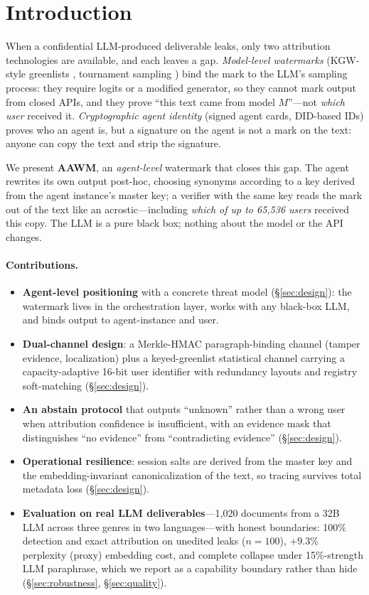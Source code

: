 \section{Introduction}
When a confidential LLM-produced deliverable leaks, only two
attribution technologies are available, and each leaves a gap. \emph{Model-level watermarks}
(KGW-style greenlists \cite{kgw}, tournament sampling \cite{synthid}) bind the mark to the LLM's
sampling process: they require logits or a modified generator, so they
cannot mark output from closed APIs, and they prove ``this text came from
model $M$''---not \emph{which user} received it. \emph{Cryptographic agent
identity} \cite{agentpin} (signed agent cards, DID-based IDs) proves who an agent is, but a
signature on the agent is not a mark on the text: anyone can copy the text
and strip the signature.

We present \textbf{AAWM}, an \emph{agent-level} watermark that closes this
gap. The agent rewrites its own output post-hoc, choosing synonyms according
to a key derived from the agent instance's master key; a verifier with the
same key reads the mark out of the text like an acrostic---including
\emph{which of up to 65,536 users} received this copy. The LLM is a pure
black box; nothing about the model or the API changes.

\paragraph{Contributions.}
\begin{itemize}
\item \textbf{Agent-level positioning} with a concrete threat model
(\S\ref{sec:design}): the watermark lives in the orchestration layer, works
with any black-box LLM, and binds output to agent-instance and user.
\item \textbf{Dual-channel design}: a Merkle-HMAC paragraph-binding channel
(tamper evidence, localization) plus a keyed-greenlist statistical channel
carrying a capacity-adaptive 16-bit user identifier with redundancy
layouts and registry soft-matching (\S\ref{sec:design}).
\item \textbf{An abstain protocol} that outputs ``unknown'' rather than a
wrong user when attribution confidence is insufficient, with an evidence
mask that distinguishes ``no evidence'' from ``contradicting evidence''
(\S\ref{sec:design}).
\item \textbf{Operational resilience}: session salts are derived from the
master key and the embedding-invariant canonicalization of the text, so
tracing survives total metadata loss (\S\ref{sec:design}).
\item \textbf{Evaluation on real LLM deliverables}---1,020 documents from a
32B LLM across three genres in two languages---with honest boundaries:
100\% detection and exact attribution on unedited leaks
($n{=}100$), $+9.3\%$ perplexity (proxy) embedding cost, and complete
collapse under 15\%-strength LLM paraphrase, which we report as a
capability boundary rather than hide (\S\ref{sec:robustness},
\S\ref{sec:quality}).
\end{itemize}
